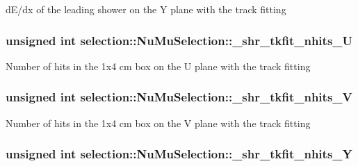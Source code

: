 d\-E/dx of the leading shower on the Y plane with the track fitting \hypertarget{classselection_1_1NuMuSelection_a49ecf4415ef54632faa2317814210b36}{
\subsubsection[{\-\_\-shr\-\_\-tkfit\-\_\-nhits\-\_\-\-U}]{\setlength{\rightskip}{0pt plus 5cm}unsigned int selection\-::\-Nu\-Mu\-Selection\-::\-\_\-shr\-\_\-tkfit\-\_\-nhits\-\_\-\-U\hspace{0.3cm}{\ttfamily [private]}}}\label{classselection_1_1NuMuSelection_a49ecf4415ef54632faa2317814210b36}
Number of hits in the 1x4 cm box on the U plane with the track fitting \hypertarget{classselection_1_1NuMuSelection_a089d245ba837cfc077d5f30dd1a309b5}{
\subsubsection[{\-\_\-shr\-\_\-tkfit\-\_\-nhits\-\_\-\-V}]{\setlength{\rightskip}{0pt plus 5cm}unsigned int selection\-::\-Nu\-Mu\-Selection\-::\-\_\-shr\-\_\-tkfit\-\_\-nhits\-\_\-\-V\hspace{0.3cm}{\ttfamily [private]}}}\label{classselection_1_1NuMuSelection_a089d245ba837cfc077d5f30dd1a309b5}
Number of hits in the 1x4 cm box on the V plane with the track fitting \hypertarget{classselection_1_1NuMuSelection_a8104bfe11a01a3afc80e48eebf0b4f1f}{
\subsubsection[{\-\_\-shr\-\_\-tkfit\-\_\-nhits\-\_\-\-Y}]{\setlength{\rightskip}{0pt plus 5cm}unsigned int selection\-::\-Nu\-Mu\-Selection\-::\-\_\-shr\-\_\-tkfit\-\_\-nhits\-\_\-\-Y\hspace{0.3cm}{\ttfamily [private]}}}\label{classselection_1_1NuMuSelection_a8104bfe11a01a3afc80e48eebf0b4f1f}
